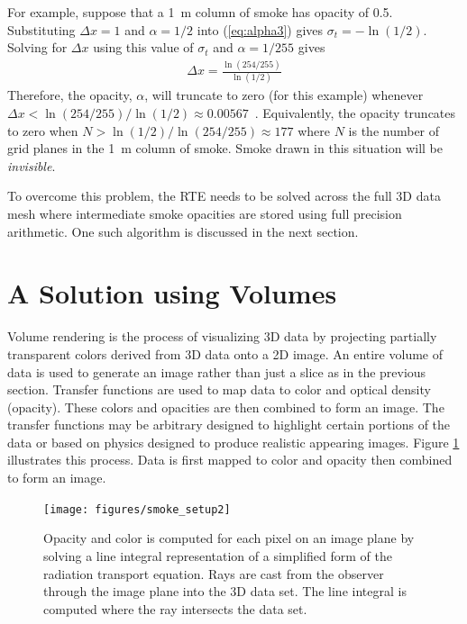 For example, suppose that a 1~m column of smoke has opacity of 0.5.  Substituting $\Delta x=1$ and $\alpha=1/2$ into (\ref{eq:alpha3}) gives $\sigma_t=-\ln(1/2)$.  Solving for $\Delta x$ using this value of $\sigma_t$ and $\alpha=1/255$ gives
\begin{eqnarray*}
\Delta x = \frac{\ln(254/255)}{\ln(1/2)}
\end{eqnarray*}
Therefore, the opacity, $\alpha$, will truncate to zero (for this example) whenever $\Delta x<\ln(254/255)/\ln(1/2)\approx 0.00567$~.  Equivalently, the opacity truncates to zero when $N>\ln(1/2)/\ln(254/255)\approx 177$ where $N$ is the number of grid planes in the 1~m column of smoke.  Smoke drawn in this situation will be {\em invisible}.

To overcome this problem, the RTE needs to be solved across the full 3D data mesh where intermediate smoke opacities are stored using full precision arithmetic.  One such algorithm is discussed in the next section.


\section{A Solution using Volumes}
Volume rendering is the process of visualizing 3D data by projecting partially transparent colors derived from 3D data onto a 2D image.  An entire volume of data is used to generate an image rather than just a slice as in the previous section.  Transfer functions are used to map data to color and optical density (opacity).  These colors and opacities are then combined to form an image.  The transfer functions may be arbitrary designed to highlight certain portions of the data or based on physics designed to produce realistic appearing images.  Figure \ref{figsmokesetup2} illustrates this process.  Data is first mapped to color and opacity then combined to form an image.

\begin{figure}[\figoptions]
\begin{center}
\texttt{[image: figures/smoke\_setup2]}
\end{center}
\caption[Opacity and color is computed for each pixel on an image plane by solving a line integral
representation of a simplified form of the radiation transport equation.]{Opacity and color is computed for each pixel on an image plane by solving a line integral
representation of a simplified form of the radiation transport equation.  Rays are cast from the observer through the  image plane into the 3D data set.  The line integral is computed where the ray intersects the data set.
}
\label{figsmokesetup2}
\end{figure}

